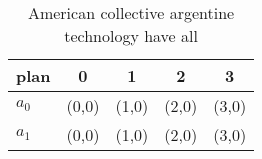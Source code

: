 \documentclass[a4paper]{article}
\begin{document}
\begin{table}
\begin{adjustbox}{width=0.6\columnwidth}
\begin{tabular}{|l|l|l|l|l|}
\hline
\textbf{plan} & \multicolumn{1}{c|}{\textbf{0}} & \multicolumn{1}{c|}{\textbf{1}} & \multicolumn{1}{c|}{\textbf{2}} & \multicolumn{1}{c|}{\textbf{3}} \\ \hline
\textbf{$a_0$}  & (0,0) & (1,0) & (2,0) & (3,0) \\ \hline
\textbf{$a_1$}  & (0,0) & (1,0) & (2,0) & (3,0) \\ \hline
\end{tabular}
\end{adjustbox}
\caption{American collective argentine technology have all
}
\end{table}
\end{document}

